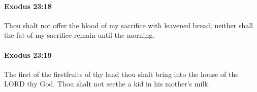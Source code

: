 		\paragraph{Exodus 23:18} %
			\label{EXODUS-23-18}

			Thou shalt not offer the blood of my sacrifice with leavened bread; neither shall the fat of my sacrifice remain until the morning.


		\paragraph{Exodus 23:19} %
			\label{EXODUS-23-19}

			The first of the firstfruits of thy land thou shalt bring into the house of the LORD thy God. Thou shalt not seethe a kid in his mother's milk.


